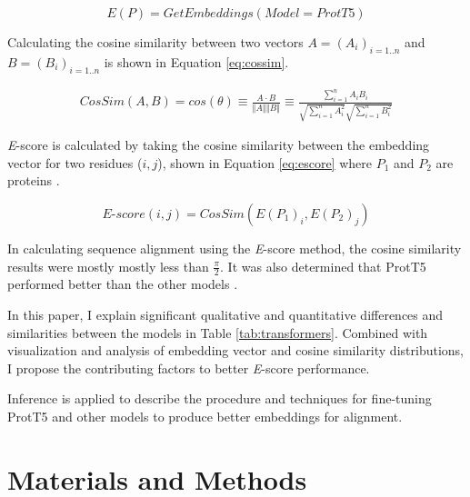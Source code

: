 \documentclass[
	letterpaper, %
	10pt, %
]{journalArticle}
\begin{document}
\begin{equation}
    E(P) = GetEmbeddings(Model = ProtT5)
    \label{eq:embedding}
\end{equation}

Calculating the cosine similarity between two vectors \(A = (A_i)_{i=1..n}\) and \(B = (B_i)_{i=1..n}\) is shown in Equation \ref{eq:cossim}.

\begin{equation}
    \begin{aligned}
        CosSim(A, B) = cos(\theta) \equiv \frac{A \cdot B}{\Vert A \Vert \Vert B \Vert} %
        \equiv \frac{\sum\limits_{i=1}^{n} A_iB_i}{\sqrt{\sum\limits_{i=1}^{n} A_i^2}\sqrt{\sum\limits_{i=1}^{n} B_i^2}}
    \end{aligned}
	\label{eq:cossim}
\end{equation}

\textit{E}-score is calculated by taking the cosine similarity between the embedding vector for two residues (\(i, j\)), shown in Equation \ref{eq:escore} where \(P_1\) and \(P_2\) are proteins \autocite{Ashrafzadeh:2023}.

\begin{equation}
    \textit{E}\mbox{-}score(i,j) = CosSim(E(P_1)_i, E(P_2)_j)
    \label{eq:escore}
\end{equation}

In calculating sequence alignment using the \textit{E}-score method, the cosine similarity results were mostly  mostly less than \(\frac{\pi}{2}\). It was also determined that ProtT5 performed better than the other models \autocite{Ashrafzadeh:2023}.

In this paper, I explain significant qualitative and quantitative differences and similarities between the models in Table \ref{tab:transformers}. Combined with visualization and analysis of embedding vector and cosine similarity distributions, I propose the contributing factors to better \textit{E}-score performance.

Inference is applied to describe the procedure and techniques for fine-tuning ProtT5 and other models to produce better embeddings for alignment.

\section{Materials and Methods}
\end{document}
